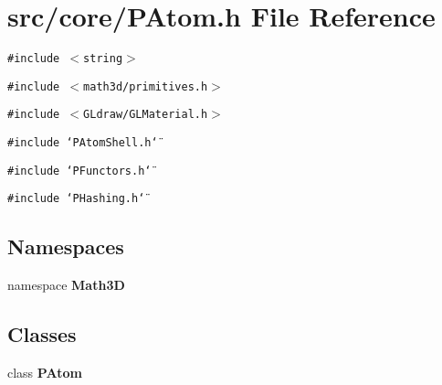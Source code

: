 \section{src/core/PAtom.h File Reference}
\label{PAtom_8h}


{\tt \#include $<$string$>$}\par
{\tt \#include $<$math3d/primitives.h$>$}\par
{\tt \#include $<$GLdraw/GLMaterial.h$>$}\par
{\tt \#include \char`\"{}PAtom\-Shell.h\char`\"{}}\par
{\tt \#include \char`\"{}PFunctors.h\char`\"{}}\par
{\tt \#include \char`\"{}PHashing.h\char`\"{}}\par
\subsection*{Namespaces}
\begin{CompactItemize}
\item 
namespace {\bf Math3D}
\end{CompactItemize}
\subsection*{Classes}
\begin{CompactItemize}
\item 
class {\bf PAtom}
\end{CompactItemize}
